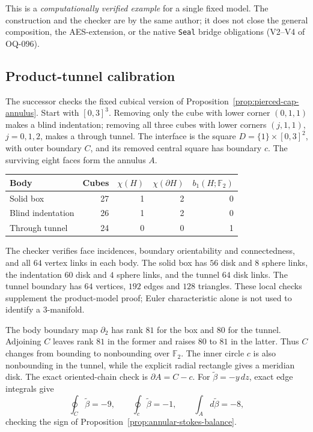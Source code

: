 This is a \emph{computationally verified example} for a single fixed model.  The
construction and the checker are by the same author; it does not close the
general composition, the AES-extension, or the native \texttt{Seal} bridge
obligations (V2--V4 of OQ-096).

\subsection{Product-tunnel calibration}
\label{app:product-tunnel-calibration}

The successor  checks
the fixed cubical version of Proposition~\ref{prop:pierced-cap-annulus}.
Start with $[0,3]^3$.  Removing only the cube with lower corner $(0,1,1)$
makes a blind indentation; removing all three cubes with lower corners
$(j,1,1)$, $j=0,1,2$, makes a through tunnel.  The interface is the square
$D=\{1\}\times[0,3]^2$, with outer boundary $C$, and its removed central
square has boundary $c$.  The surviving eight faces form the annulus $A$.

\begin{center}
\begin{tabular}{lrrrr}
\toprule
Body & Cubes & $\chi(H)$ & $\chi(\partial H)$ & $b_1(H;\mathbb F_2)$\\
\midrule
Solid box & 27 & 1 & 2 & 0\\
Blind indentation & 26 & 1 & 2 & 0\\
Through tunnel & 24 & 0 & 0 & 1\\
\bottomrule
\end{tabular}
\end{center}

The checker verifies face incidences, boundary orientability and connectedness,
and all $64$ vertex links in each body.  The solid box has $56$ disk and $8$
sphere links, the indentation $60$ disk and $4$ sphere links, and the tunnel
$64$ disk links.  The tunnel boundary has $64$ vertices, $192$ edges and
$128$ triangles.  These local checks supplement the product-model proof;
Euler characteristic alone is not used to identify a $3$-manifold.

The body boundary map $\partial_2$ has rank $81$ for the box and $80$ for the
tunnel.  Adjoining $C$ leaves rank $81$ in the former and raises $80$ to $81$
in the latter.  Thus $C$ changes from bounding to nonbounding over
$\mathbb F_2$.  The inner circle $c$ is also nonbounding in the tunnel, while
the explicit radial rectangle gives a meridian disk.  The exact oriented-chain
check is $\partial A=C-c$.  For $\widetilde\beta=-y\,dz$, exact edge integrals
give
\[
 \oint_C\widetilde\beta=-9,\qquad
 \oint_c\widetilde\beta=-1,\qquad
 \int_A d\widetilde\beta=-8,
\]
checking the sign of Proposition~\ref{prop:annular-stokes-balance}.

